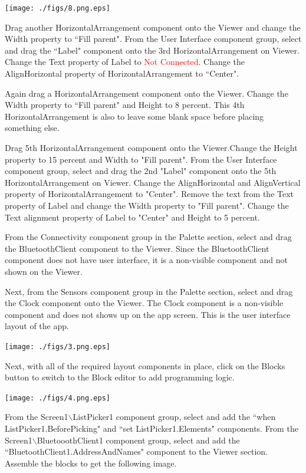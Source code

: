 \documentclass[journal,12pt,twocolumn]{IEEEtran}
\begin{document}
%
\texttt{[image: ./figs/8.png.eps]}
\begin{problem}
Drag another HorizontalArrangement component onto the Viewer and change the Width property to ``Fill parent". From the User Interface component group, select and drag the ``Label" component onto the 3rd HorizontalArrangement on Viewer. Change the Text property of Label to \textcolor{red}{Not Connected}. Change the  AlignHorizontal property of HorizontalArrangement to ``Center".
\end{problem}
%
\begin{problem}
Again drag a HorizontalArrangement component onto the Viewer. Change the Width property to ``Fill parent" and Height to 8 percent. This 4th HorizontalArrangement is also to leave some blank space before placing something else.
\end{problem}
%
\begin{problem}
Drag 5th HorizontalArrangement component onto the Viewer.Change the Height property to 15 percent and Width to "Fill parent". From the User Interface component group, select and drag the 2nd  "Label" component onto the 5th HorizontalArrangement on Viewer. Change the AlignHorizontal and AlignVertical property of  HorizontalArrangement to "Center". Remove the text from the Text property of Label and change the Width property to "Fill parent". Change the Text alignment property of Label to "Center" and Height to 5 percent.
\end{problem}
%
\begin{problem}
From the Connectivity component group in the Palette section, select and drag the BluetoothClient component to the Viewer. Since the BluetoothClient component does not have user interface, it is a non-visible component and not shown on the Viewer.
\end{problem}
%
\begin{problem}
Next, from the Sensors component group in the Palette section, select and drag the Clock component onto the Viewer. The Clock component is a non-visible component and does not shows up on the app screen. This is the user interface layout of the app.
\end{problem}
%
\texttt{[image: ./figs/3.png.eps]}
\begin{problem}
Next, with all of the required layout components in place, click on the Blocks button to switch to the Block editor to add programming logic.
\end{problem}
%
\texttt{[image: ./figs/4.png.eps]}
\begin{problem}
From the  Screen1$\backslash$ListPicker1 component group, select and add the ``when ListPicker1.BeforePicking" and ``set ListPicker1.Elements" components. From the  Screen1$\backslash$BluetooothClient1 component group, select and add the ``BluetoothClient1.AddressAndNames" component to the Viewer section. Assemble the blocks to get the following image.
\end{problem}
\end{document}
